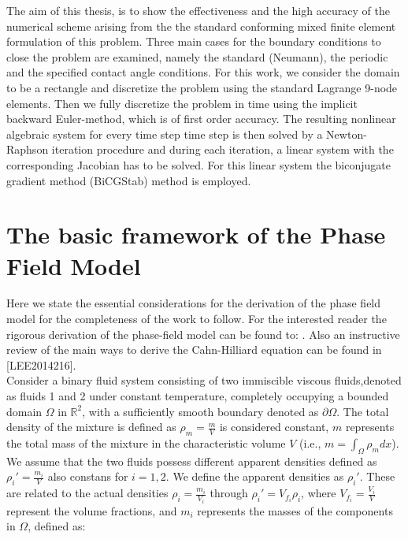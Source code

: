 \documentclass{article}
\begin{document}
The aim of this thesis, is to show the effectiveness and the high accuracy of the numerical scheme arising from the the standard conforming mixed finite element formulation of this problem. Three main cases for the boundary conditions  to close the problem are examined, namely the standard (Neumann), the periodic and the specified contact angle conditions. For this work, we consider the domain to be a rectangle and discretize the problem using the standard Lagrange 9-node elements. Then we fully discretize
the problem in time using the implicit backward Euler-method, which is of first order accuracy. The resulting nonlinear algebraic
system for every time step time step is then solved by a Newton-Raphson iteration procedure and during each iteration, a linear system with the
corresponding Jacobian has to be solved. For this linear system the biconjugate gradient method (BiCGStab) method is employed.
\newpage


\tableofcontents
\section{The basic framework of the Phase Field Model}



Here we state the essential considerations for the derivation of the phase field model for the completeness of the work to follow.
For the  interested reader the rigorous derivation of the phase-field model can be found to:  \cite{Elliott1989}. Also an instructive review of the main ways to derive the Cahn-Hilliard equation can be found in [LEE2014216].\\

Consider a binary fluid system consisting of two immiscible viscous fluids,denoted as fluids 1 and 2 under constant temperature, completely occupying a bounded domain $\Omega$ in $\mathbb{R}^2$, with a sufficiently smooth boundary denoted as $\partial\Omega$. The total density of the mixture is defined as $\rho_m = \frac{m}{V}$ is considered constant, $m$ represents the total mass of the mixture in the characteristic volume $V$ (i.e., $m = \int_{\Omega} \rho_m dx$). We assume that the two fluids possess different apparent densities defined as $\rho_i' = \frac{m_i}{V}$ also constans for $i = 1, 2$. We define the apparent densities as $\rho_i'$. These are related to the actual densities $\rho_i = \frac{m_i}{V_i}$ through $\rho_i' = V_{f_i} \rho_i$, where $V_{f_i} = \frac{V_i}{V}$ represent the volume fractions, and $m_i$ represents the masses of the components in $\Omega$, defined as:
\end{document}
